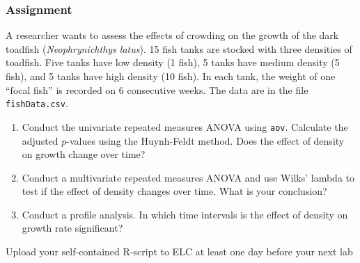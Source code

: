 \documentclass[color=usenames,dvipsnames]{beamer}\usepackage[]{graphicx}\usepackage[]{color}
\newcommand{\inr}[1]{\colorbox{inlinecolor}{\texttt{#1}}}
\begin{document}
\begin{frame}
  \frametitle{Assignment}
  \footnotesize
  A researcher wants to assess the effects of crowding on the growth
  of the dark toadfish ({\it Neophrynichthys latus}). 15 fish tanks
  are stocked with three densities of toadfish. Five tanks have
  low density (1 fish), 5 tanks have medium density (5
  fish), and 5 tanks have high density (10 fish).
  In each tank, the weight of one ``focal fish'' is recorded on 6
  consecutive weeks. The data are in the file {\tt fishData.csv}.
  \pause
  \vfill
  \begin{enumerate}[\bf (1)]
    \item Conduct the univariate repeated measures ANOVA using
      \inr{aov}. Calculate the adjusted $p$-values using the Huynh-Feldt
      method. Does the effect of density on growth change over time?
    \item Conduct a multivariate repeated measures ANOVA and use
      Wilks' lambda to test if the effect of density changes over
      time. What is your conclusion?
    \item Conduct a profile analysis. In which time intervals is the
      effect of density on growth rate significant?
  \end{enumerate}
  \pause
  \vfill
  \centering
  Upload your self-contained R-script to ELC at least one day before
  your next lab \\
\end{frame}
\end{document}

